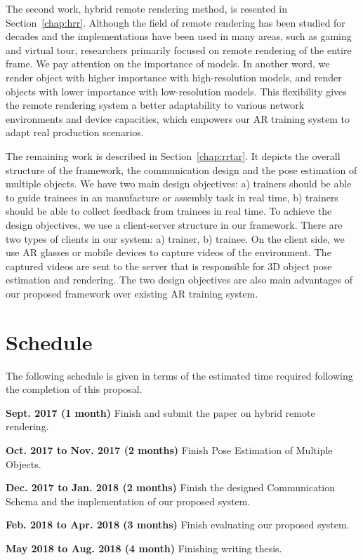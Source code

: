 The second work, hybrid remote rendering method, is resented in Section~\ref{chap:hrr}.
Although the field of remote rendering has been studied for decades and the implementations have been used in many areas, such as gaming and virtual tour, researchers primarily focused on remote rendering of the entire frame.
We pay attention on the importance of models. In another word, we render object with higher importance with high-resolution models, and render objects with lower importance with low-resolution models.
This flexibility gives the remote rendering system a better adaptability to various network environments and device capacities, which empowers our AR training system to adapt real production scenarios.

The remaining work is described in Section~\ref{chap:rrtar}.
It depicts the overall structure of the framework, the communication design and the pose estimation of multiple objects.
We have two main design objectives: a) trainers should be able to guide trainees in an manufacture or assembly task in real time, b) trainers should be able to collect feedback from trainees in real time.
To achieve the design objectives, we use a client-server structure in our framework.
There are two types of clients in our system: a) trainer, b) trainee. On the client side, we use AR glasses or mobile devices to capture videos of the environment.
The captured videos are sent to the server that is responsible for 3D object pose estimation and rendering.
The two design objectives are also main advantages of our proposed framework over existing AR training system.

\section{Schedule}

The following schedule is given in terms of the estimated time required following the completion of this proposal.

\textbf{Sept. 2017 (1 month)} Finish and submit the paper on hybrid remote rendering.

\textbf{Oct. 2017 to Nov. 2017 (2 months)} Finish Pose Estimation of Multiple Objects.

\textbf{Dec. 2017 to Jan. 2018 (2 months)} Finish the designed Communication Schema and the implementation of our proposed system.

\textbf{Feb. 2018 to Apr. 2018 (3 months)} Finish evaluating our proposed system.

\textbf{May 2018 to Aug. 2018 (4 month)} Finishing writing thesis.
